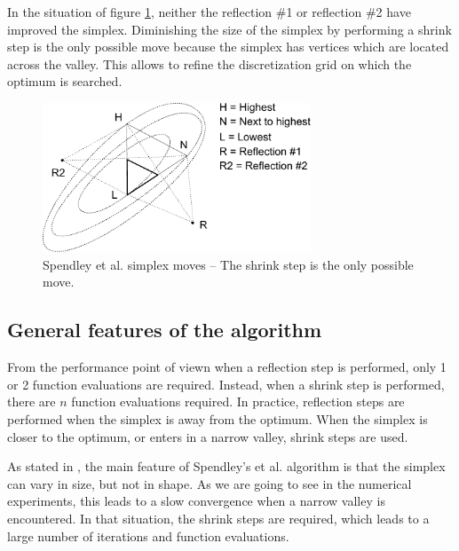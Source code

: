 In the situation of figure \ref{fig-spendley-moves-shrink}, neither the 
reflection \#1 or reflection \#2 have improved the simplex. 
Diminishing the size of the simplex by performing a shrink step 
is the only possible move because the 
simplex has vertices which are located across the valley.
This allows to refine the discretization grid on which the 
optimum is searched.

\begin{figure}
\begin{center}
\includegraphics[width=8cm]{spendley-steps-shrink.pdf}
\end{center}
\caption{Spendley et al. simplex moves -- The shrink step is the 
only possible move.}
\label{fig-spendley-moves-shrink}
\end{figure}



\subsection{General features of the algorithm}

From the performance point of viewn when a reflection step is performed,
only 1 or 2 function evaluations are required. Instead, when a shrink
step is performed, there are $n$ function evaluations required. In practice,
reflection steps are performed when the simplex is away from the optimum.
When the simplex is closer to the optimum, or enters in a narrow valley, shrink
steps are used.

As stated in \cite{Singer:2009}, the main feature 
of Spendley's et al. algorithm is that the simplex can vary 
in size, but not in shape. As we are going to see in the numerical 
experiments, this leads to a slow convergence when a narrow 
valley is encountered. In that situation, the shrink
steps are required, which leads to a large number 
of iterations and function evaluations.

